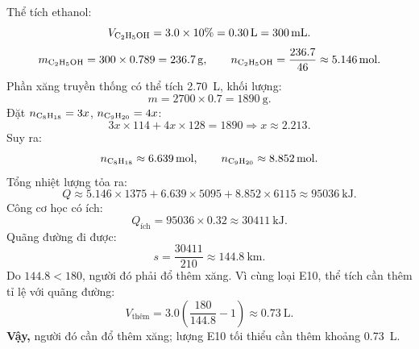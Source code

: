 \begin{loigiaiBT}
Thể tích ethanol:
\[
V_{\ce{C2H5OH}}=3.0\times10\%=\SI{0.30}{\liter}=\SI{300}{\milli\liter}.
\]
\[
m_{\ce{C2H5OH}}=300\times0.789=\SI{236.7}{\gram},\qquad
n_{\ce{C2H5OH}}=\frac{236.7}{46}\approx\SI{5.146}{\mole}.
\]
Phần xăng truyền thống có thể tích \SI{2.70}{\liter}, khối lượng:
\[
m=2700\times0.7=\SI{1890}{\gram}.
\]
Đặt $n_{\ce{C8H18}}=3x$, $n_{\ce{C9H20}}=4x$:
\[
3x\times114+4x\times128=1890\Rightarrow x\approx2.213.
\]
Suy ra:
\[
n_{\ce{C8H18}}\approx\SI{6.639}{\mole},\qquad
n_{\ce{C9H20}}\approx\SI{8.852}{\mole}.
\]
Tổng nhiệt lượng tỏa ra:
\[
Q\approx5.146\times1375+6.639\times5095+8.852\times6115
\approx\SI{95036}{\kilo\joule}.
\]
Công cơ học có ích:
\[
Q_{\text{ích}}=95036\times0.32\approx\SI{30411}{\kilo\joule}.
\]
Quãng đường đi được:
\[
s=\frac{30411}{210}\approx\SI{144.8}{\kilo\metre}.
\]
Do $144.8<180$, người đó phải đổ thêm xăng. Vì cùng loại E10, thể tích cần thêm tỉ lệ với quãng đường:
\[
V_{\text{thêm}}=3.0\left(\frac{180}{144.8}-1\right)\approx\SI{0.73}{\liter}.
\]
\textbf{Vậy,} người đó cần đổ thêm xăng; lượng E10 tối thiểu cần thêm khoảng \SI{0.73}{\liter}.
\end{loigiaiBT}
